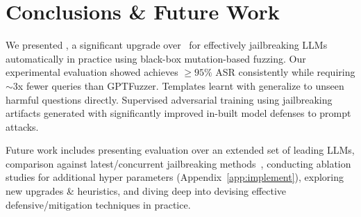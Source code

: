 \section{Conclusions \& Future Work}
\label{sec:conclusion}
We presented \bedrockfuzz, a significant upgrade over~\cite{yu2023gptfuzzer} for effectively jailbreaking LLMs automatically in practice using black-box mutation-based fuzzing. Our experimental evaluation showed \bedrockfuzz achieves $\geq 95\%$ ASR consistently while requiring $\sim$3x fewer queries than GPTFuzzer. 
Templates learnt with \bedrockfuzz generalize to unseen harmful questions directly. Supervised adversarial training using jailbreaking artifacts generated with \bedrockfuzz significantly improved in-built model defenses to prompt attacks.

Future work includes presenting evaluation over an extended set of leading LLMs, comparison against latest/concurrent jailbreaking methods~\cite{liu2024autodan,pavlova2024automated, lin2024pathseeker, chen2024llm,liu2024flipattack}, conducting ablation studies for additional hyper parameters (Appendix~\ref{app:implement}), exploring new upgrades \& heuristics, and diving deep into devising effective defensive/mitigation techniques in practice.
